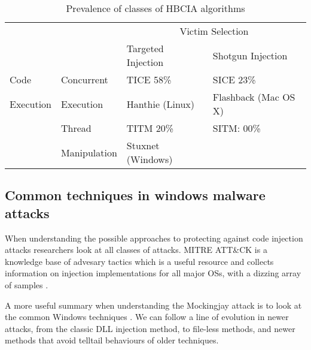 \begin{table}[!ht]
  \centering
  \caption{Prevalence of classes of HBCIA algorithms \autocite{Barabosch:2014}}
\begin{tabular}{ |p{2cm}|p{2.5cm}||p{4.2cm}|p{4.2cm}|  }
  \hline
  & & \multicolumn{2}{|c|}{Victim Selection} \\
  \cline{3-4}
  & & Targeted Injection & Shotgun Injection \\ 
  \hline
  \hline
  Code  & 	Concurrent  & TICE 58\% & SICE 23\% \\
  Execution & Execution &  Hanthie (Linux) & Flashback (Mac OS X) \\
  \cline{2-4}
  &  Thread  & TITM 20\%  & SITM: 00\% \\
  & Manipulation & Stuxnet (Windows) &  \\
  \hline
\end{tabular}
\label{table: HBCIA}
\end{table}


\subsection{Common techniques in windows malware attacks}

When understanding the possible approaches to protecting against code injection attacks researchers look at all classes of attacks.
MITRE ATT\&CK\textregistered\; is a knowledge base of advesary tactics which is a useful resource and collects information on injection implementations
for all major OSs, with a dizzing array of samples \autocite{Mitre:2017}.

A more useful summary when understanding the Mockingjay attack is to look at the common Windows techniques \autocite{Hosseini:2017}.  We
can follow a line of evolution in newer attacks, from the classic DLL injection method, to file-less methods, and newer methods that
avoid telltail behaviours of older techniques.

